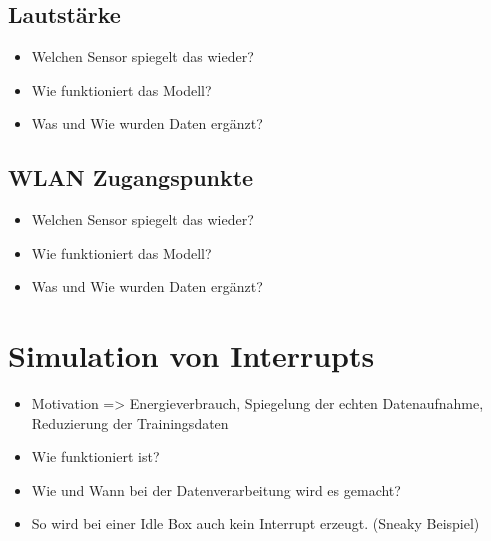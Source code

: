 \subsection{Lautstärke}
\begin{itemize}
    \item Welchen Sensor spiegelt das wieder?
    \item Wie funktioniert das Modell?
    \item Was und Wie wurden Daten ergänzt?
\end{itemize}

\subsection{WLAN Zugangspunkte}
\begin{itemize}
    \item Welchen Sensor spiegelt das wieder?
    \item Wie funktioniert das Modell?
    \item Was und Wie wurden Daten ergänzt?
\end{itemize}

\section{Simulation von Interrupts}
\begin{itemize}
    \item Motivation => Energieverbrauch, Spiegelung der echten Datenaufnahme, Reduzierung der Trainingsdaten
    \item Wie funktioniert ist?
    \item Wie und Wann bei der Datenverarbeitung wird es gemacht?
    \item So wird bei einer Idle Box auch kein Interrupt erzeugt. (Sneaky Beispiel)
\end{itemize}

